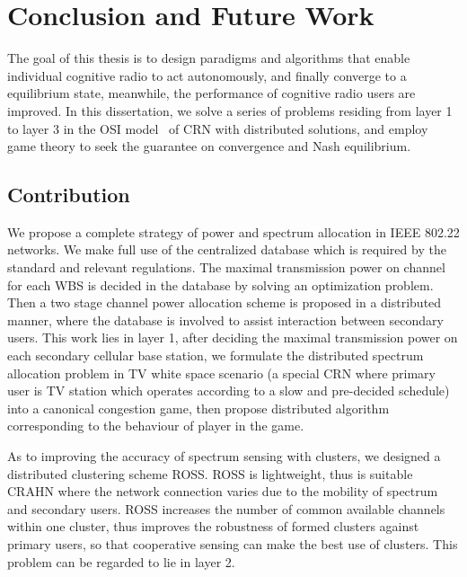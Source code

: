 \chapter{Conclusion and Future Work}

The goal of this thesis is to design paradigms and algorithms that enable individual cognitive radio to act autonomously, and finally converge to a equilibrium state, meanwhile, the performance of cognitive radio users are improved.
In this dissertation, we solve a series of problems residing from layer 1 to layer 3 in the OSI model~\cite{osi} of CRN with distributed solutions, and employ game theory to seek the guarantee on convergence and Nash equilibrium.

\section{Contribution}
We propose a complete strategy of power and spectrum allocation in IEEE 802.22 networks.
We make full use of the centralized database which is required by the standard and relevant regulations.
The maximal transmission power on channel for each WBS is decided in the database by solving an optimization problem.
Then a two stage channel power allocation scheme is proposed in a distributed manner, where the database is involved to assist interaction between secondary users.
This work lies in layer 1, after deciding the maximal transmission power on each secondary cellular base station, we formulate the distributed spectrum allocation problem in TV white space scenario (a special CRN where primary user is TV station which operates according to a slow and pre-decided schedule) into a canonical congestion game, then propose distributed algorithm corresponding to the behaviour of player in the game.

As to improving the accuracy of spectrum sensing with clusters, we designed a distributed clustering scheme ROSS.
ROSS is lightweight, thus is suitable CRAHN where the network connection varies due to the mobility of spectrum and secondary users.
ROSS increases the number of common available channels within one cluster, thus improves the robustness of formed clusters against primary users, so that cooperative sensing can make the best use of clusters.
This problem can be regarded to lie in layer 2.

